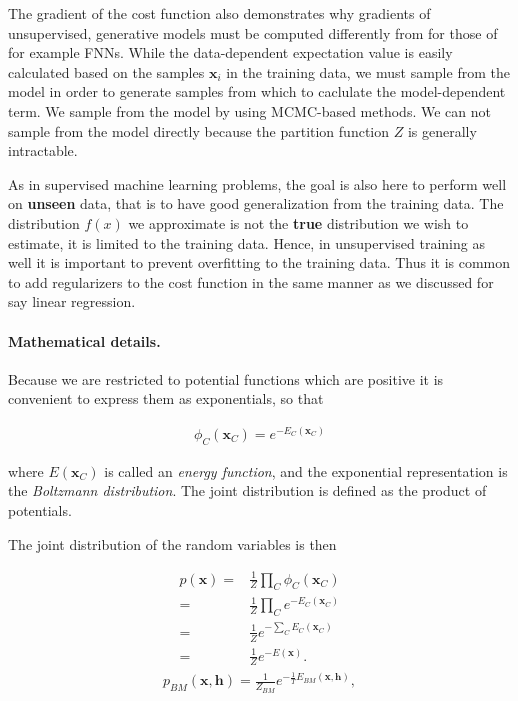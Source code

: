 \documentclass[%
oneside,                 %
final,                   %
10pt]{article}
\begin{document}
The gradient of the cost function also demonstrates why gradients of
unsupervised, generative models must be computed differently from for
those of for example FNNs. While the data-dependent expectation value
is easily calculated based on the samples $\bm{x}_i$ in the training
data, we must sample from the model in order to generate samples from
which to caclulate the model-dependent term. We sample from the model
by using MCMC-based methods. We can not sample from the model directly
because the partition function $Z$ is generally intractable.

As in supervised machine learning problems, the goal is also here to
perform well on \textbf{unseen} data, that is to have good
generalization from the training data. The distribution $f(x)$ we
approximate is not the \textbf{true} distribution we wish to estimate,
it is limited to the training data. Hence, in unsupervised training as
well it is important to prevent overfitting to the training data. Thus
it is common to add regularizers to the cost function in the same
manner as we discussed for say linear regression.

\paragraph{Mathematical details.}
Because we are restricted to potential functions which are positive it
is convenient to express them as exponentials, so that

\begin{align}
	\phi_C (\bm{x}_C) = e^{-E_C(\bm{x}_C)}
\end{align}

where $E(\bm{x}_C)$ is called an \emph{energy function}, and the
exponential representation is the \emph{Boltzmann distribution}. The
joint distribution is defined as the product of potentials.

The joint distribution of the random variables is then

\begin{align}
	p(\bm{x}) =& \frac{1}{Z} \prod_C \phi_C (\bm{x}_C) \nonumber \\
	=& \frac{1}{Z} \prod_C e^{-E_C(\bm{x}_C)} \nonumber \\
	=& \frac{1}{Z} e^{-\sum_C E_C(\bm{x}_C)} \nonumber \\
	=& \frac{1}{Z} e^{-E(\bm{x})}.
\end{align} 
\begin{align}
	p_{BM}(\bm{x}, \bm{h}) = \frac{1}{Z_{BM}} e^{-\frac{1}{T}E_{BM}(\bm{x}, \bm{h})} ,
\end{align}
\end{document}
